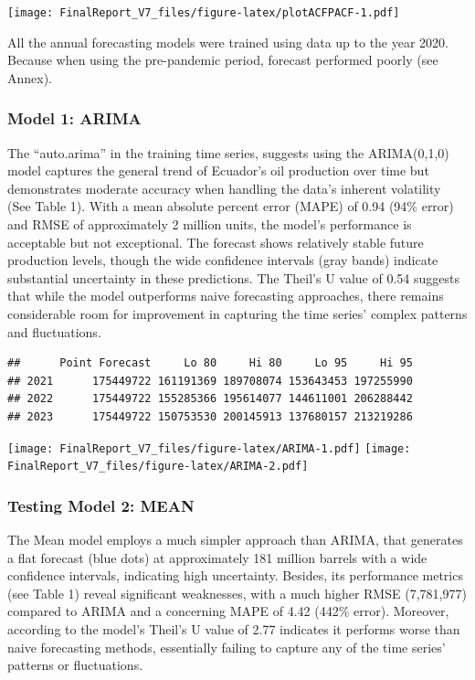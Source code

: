 \documentclass[
]{article}
\begin{document}
\texttt{[image: FinalReport\_V7\_files/figure-latex/plotACFPACF-1.pdf]}

All the annual forecasting models were trained using data up to the year
2020. Because when using the pre-pandemic period, forecast performed
poorly (see Annex).

\subsubsection{Model 1: ARIMA}\label{model-1-arima}

The ``auto.arima'' in the training time series, suggests using the
ARIMA(0,1,0) model captures the general trend of Ecuador's oil
production over time but demonstrates moderate accuracy when handling
the data's inherent volatility (See Table 1). With a mean absolute
percent error (MAPE) of 0.94 (94\% error) and RMSE of approximately 2
million units, the model's performance is acceptable but not
exceptional. The forecast shows relatively stable future production
levels, though the wide confidence intervals (gray bands) indicate
substantial uncertainty in these predictions. The Theil's U value of
0.54 suggests that while the model outperforms naive forecasting
approaches, there remains considerable room for improvement in capturing
the time series' complex patterns and fluctuations.

\begin{verbatim}
##      Point Forecast     Lo 80     Hi 80     Lo 95     Hi 95
## 2021      175449722 161191369 189708074 153643453 197255990
## 2022      175449722 155285366 195614077 144611001 206288442
## 2023      175449722 150753530 200145913 137680157 213219286
\end{verbatim}

\texttt{[image: FinalReport\_V7\_files/figure-latex/ARIMA-1.pdf]}
\texttt{[image: FinalReport\_V7\_files/figure-latex/ARIMA-2.pdf]}

\subsubsection{Testing Model 2: MEAN}\label{testing-model-2-mean}

The Mean model employs a much simpler approach than ARIMA, that
generates a flat forecast (blue dots) at approximately 181 million
barrels with a wide confidence intervals, indicating high uncertainty.
Besides, its performance metrics (see Table 1) reveal significant
weaknesses, with a much higher RMSE (7,781,977) compared to ARIMA and a
concerning MAPE of 4.42 (442\% error). Moreover, according to the
model's Theil's U value of 2.77 indicates it performs worse than naive
forecasting methods, essentially failing to capture any of the time
series' patterns or fluctuations.
\end{document}
